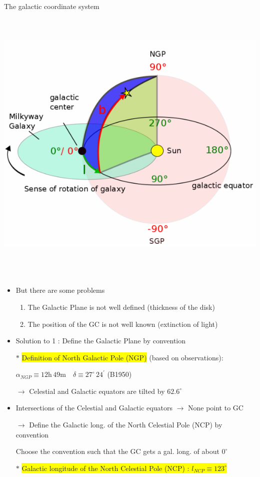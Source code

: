 \Tr
\onecolumn
\begin{center}
{\blue The galactic coordinate system}\\[3mm]
\includegraphics[keepaspectratio,height=14cm]{galactic-coord}
\end{center}

\Tr
\onecolumn
\begin{itemize}
\item {\blue But there are some problems}
\begin{enumerate}
\item The Galactic Plane is not well defined (thickness of the disk)
\item The position of the GC is not well known (extinction of light)
\end{enumerate}
\item Solution to 1 : {\blue Define the Galactic Plane by convention}
\item[$\ast$] \colorbox{yellow}{Definition of North Galactic Pole (NGP)} (based on observations):
\item[] $\alpha_{NGP} \equiv 12\text{h}\,49\text{m} \quad \delta \equiv 27^{\circ}\,24^{\prime}$ (B1950)
\item[] $\rightarrow$ Celestial and Galactic equators are tilted by $62.6^{\circ}$
\item Intersections of the Celestial and Galactic equators $\rightarrow$ None point to GC
\item[] $\rightarrow$ {\blue Define the Galactic long. of the North Celestial Pole (NCP) by convention}
\item[] Choose the convention such that the GC gets a gal. long. of about $0^{\circ}$ 
\item[$\ast$] \colorbox{yellow}{Galactic longitude of the North Celestial Pole (NCP) : $l_{NCP} \equiv 123^{\circ}$}
\end{itemize}

